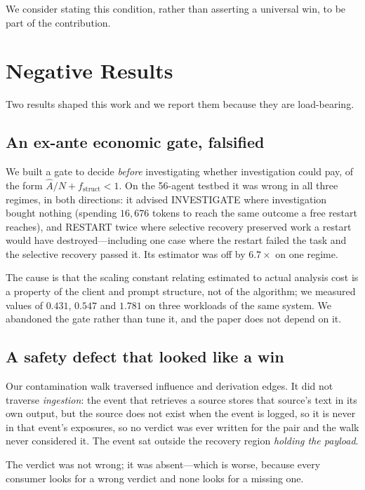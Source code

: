 \documentclass[10pt,twocolumn]{article}
\begin{document}
We consider stating this condition, rather than asserting a universal win, to
be part of the contribution.

\section{Negative Results}
\label{sec:negative}

Two results shaped this work and we report them because they are load-bearing.

\subsection{An ex-ante economic gate, falsified}

We built a gate to decide \emph{before} investigating whether investigation
could pay, of the form $\hat{A}/N + f_{\text{struct}} < 1$. On the 56-agent
testbed it was wrong in all three regimes, in both directions: it advised
INVESTIGATE where investigation bought nothing (spending $16{,}676$ tokens to
reach the same outcome a free restart reaches), and RESTART twice where
selective recovery preserved work a restart would have destroyed---including
one case where the restart failed the task and the selective recovery passed
it. Its estimator was off by $6.7\times$ on one regime.

The cause is that the scaling constant relating estimated to actual analysis
cost is a property of the client and prompt structure, not of the algorithm;
we measured values of $0.431$, $0.547$ and $1.781$ on three workloads of the
same system. We abandoned the gate rather than tune it, and the paper does not
depend on it.

\subsection{A safety defect that looked like a win}

Our contamination walk traversed influence and derivation edges. It did not
traverse \emph{ingestion}: the event that retrieves a source stores that
source's text in its own output, but the source does not exist when the event
is logged, so it is never in that event's exposures, so no verdict was ever
written for the pair and the walk never considered it. The event sat outside
the recovery region \emph{holding the payload}.

The verdict was not wrong; it was absent---which is worse, because every
consumer looks for a wrong verdict and none looks for a missing one.
\end{document}
